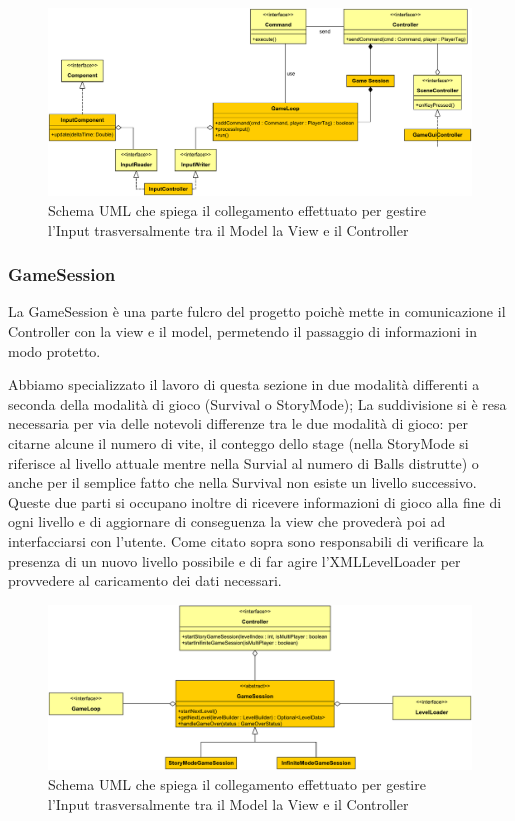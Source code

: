 \documentclass[a4paper,12pt]{report}
\begin{document}
\begin{figure}[H]
\includegraphics[width=\linewidth]{img/input}
\caption{Schema UML che spiega il collegamento effettuato per gestire l'Input trasversalmente tra il Model la View e il Controller}
\label{img:input}
\end{figure}

\subsubsection*{GameSession}

La GameSession è una parte fulcro del progetto poichè mette in comunicazione il Controller con la view e il model, permetendo il passaggio di informazioni in modo protetto.

Abbiamo specializzato il lavoro di questa sezione in due modalità differenti a seconda della modalità di gioco (Survival o StoryMode); 
La suddivisione si è resa necessaria per via delle notevoli differenze tra le due modalità di gioco: per citarne alcune il numero di vite, il conteggo dello stage (nella StoryMode si riferisce al livello attuale mentre nella Survial al numero di Balls distrutte) o anche per il semplice fatto che nella Survival non esiste un livello successivo.
Queste due parti si occupano inoltre di ricevere informazioni di gioco alla fine di ogni livello e di aggiornare di conseguenza la view che provederà poi ad interfacciarsi con l'utente.
Come citato sopra sono responsabili di verificare la presenza di un nuovo livello possibile e di far agire l'XMLLevelLoader per provvedere al caricamento dei dati necessari.

\begin{figure}[H]
\includegraphics[width=\linewidth]{img/gamesession}
\caption{Schema UML che spiega il collegamento effettuato per gestire l'Input trasversalmente tra il Model la View e il Controller}
\label{img:gamesession}
\end{figure}
\end{document}
